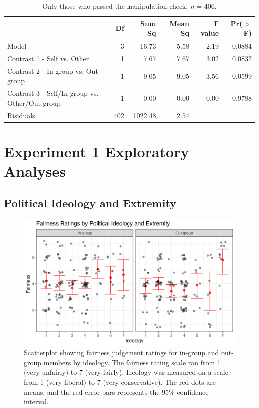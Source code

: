 \documentclass[12pt,]{article}
\begin{document}
\vspace{0.6cm}

\begin{table}[ht]
\centering
\begin{tabular}{lrrrrr}
  \hline
 & Df & Sum Sq & Mean Sq & F value & Pr($>$F) \\ 
  \hline
Model & 3 & 16.73 & 5.58 & 2.19 & 0.0884 \\ 
  Contrast 1 - Self vs. Other & 1 & 7.67 & 7.67 & 3.02 & 0.0832 \\ 
  Contrast 2 - In-group vs. Out-group & 1 & 9.05 & 9.05 & 3.56 & 0.0599 \\ 
  Contrast 3 - Self/In-group vs. Other/Out-group & 1 & 0.00 & 0.00 & 0.00 & 0.9788 \\ 
  Risiduals & 402 & 1022.48 & 2.54 &  &  \\ 
   \hline
\end{tabular}
\caption{Only those who passed the manipulation check, \emph{n} = 406.} 
\label{manip}
\end{table}



\clearpage
\section{Experiment 1 Exploratory Analyses}
\label{appendix:study1_robust}


\subsection{Political Ideology and Extremity}
\label{appendix:ideo_extrem1}

\begin{figure}
	\centering
	\includegraphics{Plots/Study1_ideology_extremity.png}
	\caption{Scatterplot showing fairness judgement ratings for in-group and out-group members by ideology. The fairness rating scale ran from 1 (very unfairly) to 7 (very fairly). Ideology was measured on a scale from 1 (very liberal) to 7 (very conservative). The red dots are means, and the red error bars represents the 95\% confidence interval.}
	\label{fig:CID_allS1}
\end{figure}
\end{document}
